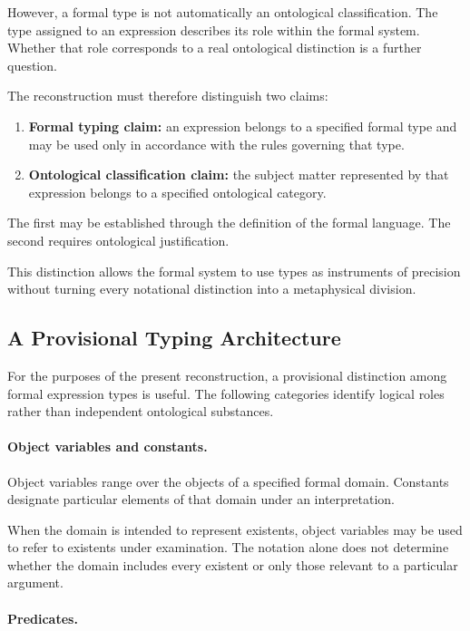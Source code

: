 However, a formal type is not automatically
an ontological classification. The type
assigned to an expression describes its
role within the formal system. Whether
that role corresponds to a real ontological
distinction is a further question.

The reconstruction must therefore distinguish
two claims:

\begin{enumerate}
    \item \textbf{Formal typing claim:}
    an expression belongs to a specified
    formal type and may be used only in
    accordance with the rules governing
    that type.

    \item \textbf{Ontological classification claim:}
    the subject matter represented by
    that expression belongs to a specified
    ontological category.
\end{enumerate}

The first may be established through the
definition of the formal language. The
second requires ontological justification.

This distinction allows the formal system
to use types as instruments of precision
without turning every notational distinction
into a metaphysical division.

\subsection{A Provisional Typing Architecture}

For the purposes of the present reconstruction,
a provisional distinction among formal expression
types is useful. The following categories
identify logical roles rather than independent
ontological substances.

\paragraph{Object variables and constants.}

Object variables range over the objects of
a specified formal domain. Constants designate
particular elements of that domain under
an interpretation.

When the domain is intended to represent
existents, object variables may be used to
refer to existents under examination.
The notation alone does not determine
whether the domain includes every existent
or only those relevant to a particular
argument.

\paragraph{Predicates.}

